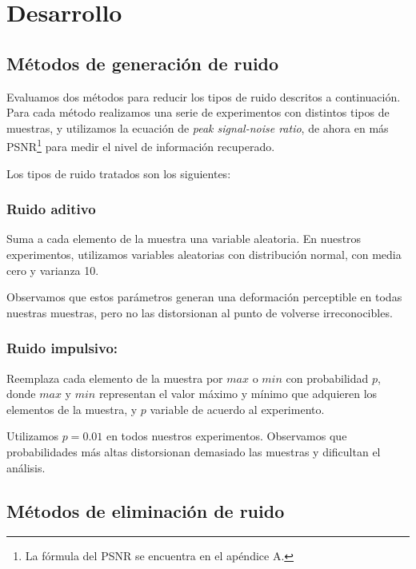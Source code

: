 \documentclass[a4paper,10pt,twoside]{article}
\begin{document}


\section{Desarrollo}

\subsection{Métodos de generación de ruido}
Evaluamos dos métodos para reducir los tipos de ruido descritos a continuación. Para cada método realizamos una serie de experimentos con distintos tipos de muestras, y utilizamos la ecuación de \textit{peak signal-noise ratio}, de ahora en más PSNR\footnote{La fórmula del PSNR se encuentra en el apéndice A.} para medir el nivel de información recuperado. 

Los tipos de ruido tratados son los siguientes:

\subsubsection{Ruido aditivo}

Suma a cada elemento de la muestra una variable aleatoria. En nuestros experimentos, utilizamos variables aleatorias con distribución normal, con media cero y varianza 10.

Observamos que estos parámetros generan una deformación perceptible en todas nuestras muestras, pero no las distorsionan al punto de volverse irreconocibles.

\subsubsection{Ruido impulsivo:}

Reemplaza cada elemento de la muestra por $max$ o $min$ con probabilidad $p$, donde $max$ y $min$ representan el valor máximo y mínimo que adquieren los elementos de la muestra, y $p$ variable de acuerdo al experimento.

Utilizamos $p = 0.01$ en todos nuestros experimentos. Observamos que probabilidades más altas distorsionan demasiado las muestras y dificultan el análisis.


\subsection{Métodos de eliminación de ruido}
\end{document}
